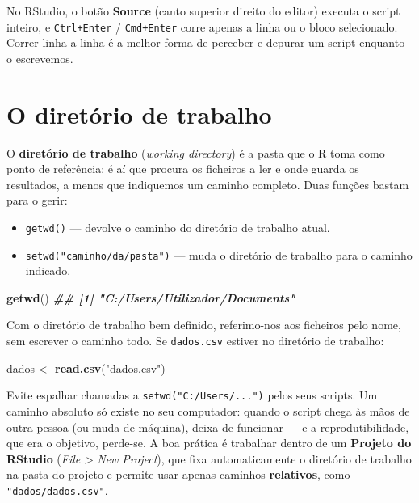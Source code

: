 \documentclass[
  portuguese,
  11pt,
  openany]{book}
\newenvironment{Shaded}{\begin{snugshade}}{\end{snugshade}}
\newcommand{\DocumentationTok}[1]{\textcolor[rgb]{0.56,0.35,0.01}{\textbf{\textit{#1}}}}
\newcommand{\FunctionTok}[1]{\textcolor[rgb]{0.13,0.29,0.53}{\textbf{#1}}}
\newcommand{\NormalTok}[1]{#1}
\newcommand{\OtherTok}[1]{\textcolor[rgb]{0.56,0.35,0.01}{#1}}
\newcommand{\StringTok}[1]{\textcolor[rgb]{0.31,0.60,0.02}{#1}}
\providecommand{\tightlist}{%
  \setlength{\itemsep}{0pt}\setlength{\parskip}{0pt}}
\begin{document}
No RStudio, o botão \textbf{Source} (canto superior direito do editor) executa o script
inteiro, e \texttt{Ctrl+Enter} / \texttt{Cmd+Enter} corre apenas a linha ou o bloco selecionado.
Correr linha a linha é a melhor forma de perceber e depurar um script enquanto o
escrevemos.

\section{O diretório de trabalho}\label{o-diretuxf3rio-de-trabalho}

O \textbf{diretório de trabalho} (\emph{working directory}) é a pasta que o R toma como ponto
de referência: é aí que procura os ficheiros a ler e onde guarda os resultados, a
menos que indiquemos um caminho completo. Duas funções bastam para o gerir:

\begin{itemize}
\tightlist
\item
  \texttt{getwd()} --- devolve o caminho do diretório de trabalho atual.
\item
  \texttt{setwd("caminho/da/pasta")} --- muda o diretório de trabalho para o caminho
  indicado.
\end{itemize}

\begin{Shaded}
\begin{Highlighting}[]
\FunctionTok{getwd}\NormalTok{()}
\DocumentationTok{\#\# [1] "C:/Users/Utilizador/Documents"}
\end{Highlighting}
\end{Shaded}

Com o diretório de trabalho bem definido, referimo-nos aos ficheiros pelo nome, sem
escrever o caminho todo. Se \texttt{dados.csv} estiver no diretório de trabalho:

\begin{Shaded}
\begin{Highlighting}[]
\NormalTok{dados }\OtherTok{\textless{}{-}} \FunctionTok{read.csv}\NormalTok{(}\StringTok{"dados.csv"}\NormalTok{)}
\end{Highlighting}
\end{Shaded}

Evite espalhar chamadas a \texttt{setwd("C:/Users/...")} pelos seus scripts. Um caminho
absoluto só existe no seu computador: quando o script chega às mãos de outra pessoa
(ou muda de máquina), deixa de funcionar --- e a reprodutibilidade, que era o objetivo,
perde-se. A boa prática é trabalhar dentro de um \textbf{Projeto do RStudio} (\emph{File \textgreater{} New
Project}), que fixa automaticamente o diretório de trabalho na pasta do projeto e
permite usar apenas caminhos \textbf{relativos}, como \texttt{"dados/dados.csv"}.
\end{document}
